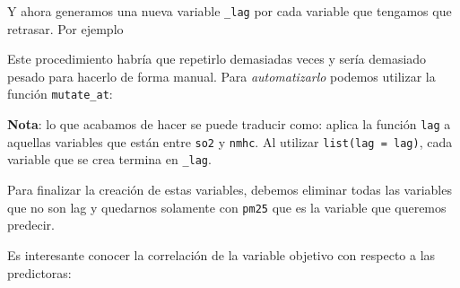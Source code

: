 \documentclass[]{article}
\newenvironment{Shaded}{\begin{snugshade}}{\end{snugshade}}
\newcommand{\DataTypeTok}[1]{\textcolor[rgb]{0.13,0.29,0.53}{#1}}
\newcommand{\KeywordTok}[1]{\textcolor[rgb]{0.13,0.29,0.53}{\textbf{#1}}}
\newcommand{\NormalTok}[1]{#1}
\newcommand{\OperatorTok}[1]{\textcolor[rgb]{0.81,0.36,0.00}{\textbf{#1}}}
\newcommand{\StringTok}[1]{\textcolor[rgb]{0.31,0.60,0.02}{#1}}
\begin{document}
Y ahora generamos una nueva variable \texttt{\_lag} por cada variable
que tengamos que retrasar. Por ejemplo

\begin{Shaded}
\end{Shaded}

Este procedimiento habría que repetirlo demasiadas veces y sería
demasiado pesado para hacerlo de forma manual. Para \emph{automatizarlo}
podemos utilizar la función \texttt{mutate\_at}:

\begin{Shaded}
\end{Shaded}

\textbf{Nota}: lo que acabamos de hacer se puede traducir como: aplica
la función \texttt{lag} a aquellas variables que están entre
\texttt{so2} y \texttt{nmhc}. Al utilizar \texttt{list(lag\ =\ lag)},
cada variable que se crea termina en \texttt{\_lag}.

Para finalizar la creación de estas variables, debemos eliminar todas
las variables que no son lag y quedarnos solamente con \texttt{pm25} que
es la variable que queremos predecir.

\begin{Shaded}
\end{Shaded}

Es interesante conocer la correlación de la variable objetivo con
respecto a las predictoras:

\begin{Shaded}
\end{Shaded}
\end{document}
